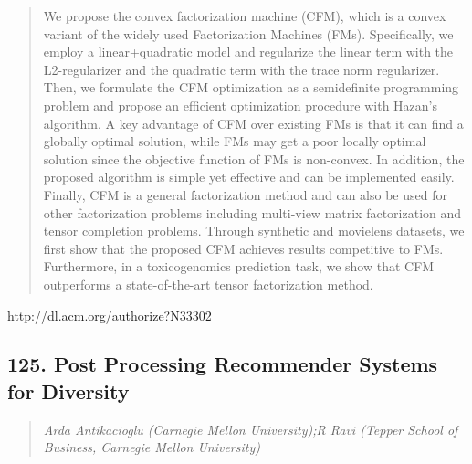 \documentclass{article}
\begin{document}
\begin{quote}
We propose the convex factorization machine (CFM), which is a convex variant of the widely used Factorization Machines (FMs). Specifically, we employ a linear+quadratic model and regularize the linear term with the L2-regularizer and the quadratic term with the trace norm regularizer. Then, we formulate the CFM optimization as a semidefinite programming problem and propose an efficient optimization procedure with Hazan’s algorithm. A key advantage of CFM over existing FMs is that it can find a globally optimal solution, while FMs may get a poor locally optimal solution since the objective function of FMs is non-convex. In addition, the proposed algorithm is simple yet effective and can be implemented easily. Finally, CFM is a general factorization method and can also be used for other factorization problems including multi-view matrix factorization and tensor completion problems. Through synthetic and movielens datasets, we first show that the proposed CFM achieves results competitive to FMs. Furthermore, in a toxicogenomics prediction task, we show that CFM outperforms a state-of-the-art tensor factorization method.
\end{quote}

\href{http://dl.acm.org/authorize?N33302}{http://dl.acm.org/authorize?N33302}

\subsection{125. Post Processing Recommender Systems for Diversity}

\begin{quote}
\footnotesize{\textit{Arda Antikacioglu (Carnegie Mellon University);R Ravi (Tepper School of Business, Carnegie Mellon University)}}

\end{quote}
\end{document}
